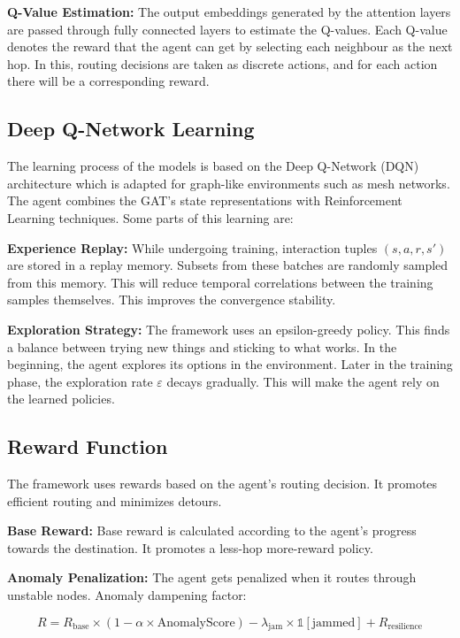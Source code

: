 \documentclass[conference]{IEEEtran}
\begin{document}
\textbf{Q-Value Estimation:} The output embeddings generated by the attention layers are passed through fully connected layers to estimate the Q-values. Each Q-value denotes the reward that the agent can get by selecting each neighbour as the next hop. In this, routing decisions are taken as discrete actions, and for each action there will be a corresponding reward.

\subsection{Deep Q-Network Learning}

The learning process of the models is based on the Deep Q-Network (DQN) architecture which is adapted for graph-like environments such as mesh networks. The agent combines the GAT's state representations with Reinforcement Learning techniques. Some parts of this learning are:

\textbf{Experience Replay:} While undergoing training, interaction tuples $(s, a, r, s')$ are stored in a replay memory. Subsets from these batches are randomly sampled from this memory. This will reduce temporal correlations between the training samples themselves. This improves the convergence stability.

\textbf{Exploration Strategy:} The framework uses an epsilon-greedy policy. This finds a balance between trying new things and sticking to what works. In the beginning, the agent explores its options in the environment. Later in the training phase, the exploration rate $\varepsilon$ decays gradually. This will make the agent rely on the learned policies.

\subsection{Reward Function}

The framework uses rewards based on the agent's routing decision. It promotes efficient routing and minimizes detours.

\textbf{Base Reward:} Base reward is calculated according to the agent's progress towards the destination. It promotes a less-hop more-reward policy.

\textbf{Anomaly Penalization:} The agent gets penalized when it routes through unstable nodes. Anomaly dampening factor:

\begin{equation}
R = R_{\text{base}} \times (1 - \alpha \times \text{AnomalyScore}) - \lambda_{\text{jam}} \times \mathbb{1}[\text{jammed}] + R_{\text{resilience}}
\end{equation}
\end{document}
